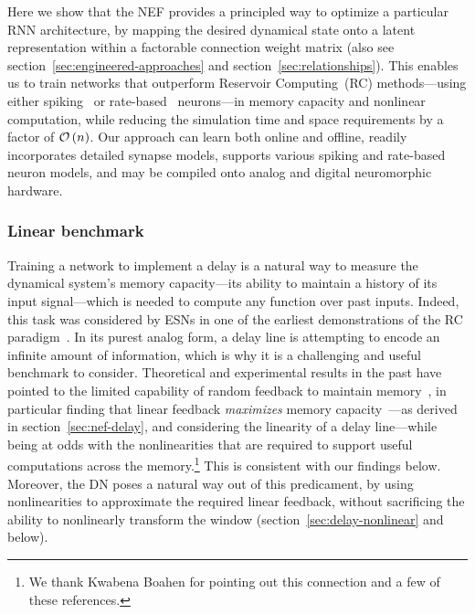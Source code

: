 Here we show that the NEF provides a principled way to optimize a particular RNN architecture, by mapping the desired dynamical state onto a latent representation within a factorable connection weight matrix (also see section~\ref{sec:engineered-approaches} and section~\ref{sec:relationships}).
This enables us to train networks that outperform Reservoir Computing~(RC) methods---using either spiking~\citep[LSM;][]{maass2002real} or rate-based~\citep[ESN;][]{jaeger2001echo} neurons---in memory capacity and nonlinear computation, while reducing the simulation time and space requirements by a factor of $\mathcal{O}\left({n}\right)$.
Our approach can learn both online and offline, readily incorporates detailed synapse models, supports various spiking and rate-based neuron models, and may be compiled onto analog and digital neuromorphic hardware.

\subsubsection{Linear benchmark}

Training a network to implement a delay is a natural way to measure the dynamical system's memory capacity---its ability to maintain a history of its input signal---which is needed to compute any function over past inputs.
Indeed, this task was considered by ESNs in one of the earliest demonstrations of the RC paradigm~\citep{jaeger2002short}.  In its purest analog form, a delay line is attempting to encode an infinite amount of information, which is why it is a challenging and useful benchmark to consider.
Theoretical and experimental results in the past have pointed to the limited capability of random feedback to maintain memory~\citep{joshi2005movement, mayor2005signal, dambre2012information, wallace2013randomly, inubushi2017reservoir, schuecker2018optimal}, in particular finding that linear feedback \emph{maximizes} memory capacity~\citep{mitra2001nonlinear}---as derived in section~\ref{sec:nef-delay}, and considering the linearity of a delay line---while being at odds with the nonlinearities that are required to support useful computations across the memory.\footnote{%
We thank Kwabena Boahen for pointing out this connection and a few of these references.
}
This is consistent with our findings below.
Moreover, the DN poses a natural way out of this predicament, by using nonlinearities to approximate the required linear feedback, without sacrificing the ability to nonlinearly transform the window (section~\ref{sec:delay-nonlinear} and below).


